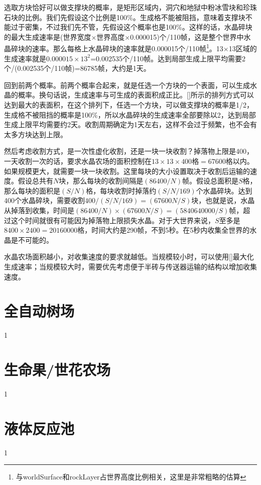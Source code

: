 选取方块恰好可以做支撑块的概率，是矩形区域内，洞穴和地狱中粉冰雪块和珍珠石块的比例。我们先假设这个比例是100\%。生成格不能被阻挡，意味着支撑块不能过于密集，不过我们先不管，先假设这个概率也是100\%。这样的话，水晶碎块的最大生成速率是(世界宽度$\times$世界高度$\times$0.000015)个/110帧，这是整个世界中水晶碎块的速率。那么每格上水晶碎块的速率就是0.000015个/110帧\footnote{与worldSurface和rockLayer占世界高度比例相关，这里是非常粗略的估算}。13$\times$13区域的生成速率就是$0.000015\times 13^2$=0.002535个/110帧。达到局部生成上限平均需要2个/(0.002535个/110帧)=86785帧，大约是1天。

回到前两个概率。前两个概率合起来，就是任选一个方块的一个表面，可以生成水晶的概率。换句话说，生成速率与可生成的表面积成正比。\autoref{}所示的排列方式可以达到最大的表面积，在这个排列下，任选一个方块，可以做支撑块的概率是1/2，生成格不被阻挡的概率是100\%，所以水晶碎块的生成速率全部要除以2，达到局部生成上限平均需要约2天。收割周期确定为1天左右，这样不会过于频繁，也不会有太多方块达到上限。

然后考虑收割方式，是一次性虚化收割，还是一块一块收割？掉落物上限是400，一天收割一次的话，要求水晶农场的面积控制在$13\times 13\times 400\textrm{格}=67600$格以内。如果规模更大，就需要一块一块收割。这里每块的大小设置取决于收割后运输的速度。假设总共有$N$块，那么每块的收割间隔是$(86400/N)$帧。假设总面积是$S$格，那么每块的面积是$(S/N)$格，每块收割时掉落约$(S/N/169)$个水晶碎块。达到400个水晶碎块，需要收割$400/(S/N/169)=(67600N/S)$块，也就是说，水晶从掉落到收集，时间是$(86400/N)\times(67600N/S)=(5840640000/S)$帧，超过这个时间就很有可能因为掉落物上限损失水晶。对于大世界来说，$S$至多是$8400\times2400=20160000$格，时间大约是290帧，不到5秒。在5秒内收集全世界的水晶是不可能的。

水晶农场面积越小，对收集速度的要求就越低。当规模较小时，可以使用\autoref{}最大化生成速率；当规模较大时，需要优先考虑便于半砖与传送器运输的结构以增加收集速度。

\section{全自动树场}
1

\section{生命果/世花农场}
1

\section{液体反应池}
1

